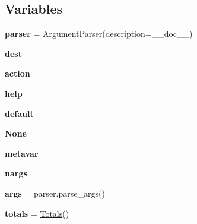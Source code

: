 \subsection*{Variables}
\begin{DoxyCompactItemize}
\item 
\mbox{\label{namespacepymavlink_1_1tools_1_1mavsummarize_a3ba68eafe41ac6abee79b85aaba7971e}} 
{\bfseries parser} = Argument\+Parser(description=\+\_\+\+\_\+doc\+\_\+\+\_\+)
\item 
\mbox{\label{namespacepymavlink_1_1tools_1_1mavsummarize_a201c21b8b10b407aa5b0d1b0b0c531eb}} 
{\bfseries dest}
\item 
\mbox{\label{namespacepymavlink_1_1tools_1_1mavsummarize_afe96e367938157d5dda6785a259fd70d}} 
{\bfseries action}
\item 
\mbox{\label{namespacepymavlink_1_1tools_1_1mavsummarize_a1b9a3b5538b331f72681081719f2ab5f}} 
{\bfseries help}
\item 
\mbox{\label{namespacepymavlink_1_1tools_1_1mavsummarize_a3b2477be194a7bc57b9ba46de40a3b86}} 
{\bfseries default}
\item 
\mbox{\label{namespacepymavlink_1_1tools_1_1mavsummarize_a3640dd29d9df59b034dad4b4b1b80f7a}} 
{\bfseries None}
\item 
\mbox{\label{namespacepymavlink_1_1tools_1_1mavsummarize_a0289f1a2b8fee0a6fc70a995e02b8319}} 
{\bfseries metavar}
\item 
\mbox{\label{namespacepymavlink_1_1tools_1_1mavsummarize_a7e5d5d2f5e6edede0363c1263cde782c}} 
{\bfseries nargs}
\item 
\mbox{\label{namespacepymavlink_1_1tools_1_1mavsummarize_aa553024892446aecf11bc6cc8f837cff}} 
{\bfseries args} = parser.\+parse\+\_\+args()
\item 
\mbox{\label{namespacepymavlink_1_1tools_1_1mavsummarize_adaec538b723dbbab18ae0166aaf4ee1d}} 
{\bfseries totals} = \hyperlink{classpymavlink_1_1tools_1_1mavsummarize_1_1Totals}{Totals}()
\end{DoxyCompactItemize}


